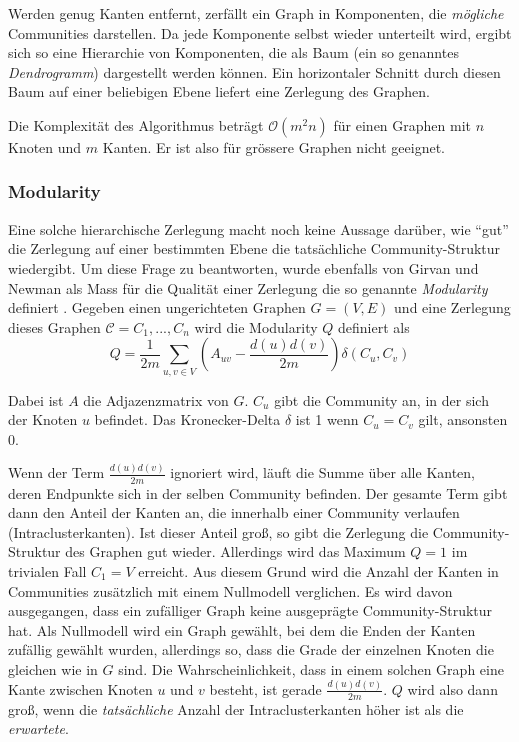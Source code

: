 Werden genug Kanten entfernt, zerfällt ein Graph in Komponenten, die
\emph{mögliche} Communities darstellen. Da jede Komponente selbst
wieder unterteilt wird, ergibt sich so eine Hierarchie von
Komponenten, die als Baum (ein so genanntes \emph{Dendrogramm})
dargestellt werden können. Ein horizontaler Schnitt durch diesen
Baum auf einer beliebigen Ebene liefert eine Zerlegung des Graphen.

Die Komplexität des Algorithmus beträgt $\mathcal{O}(m^2n)$ für
einen Graphen mit $n$ Knoten und $m$ Kanten. Er ist also für
grössere Graphen nicht geeignet.

\subsubsection{Modularity}
\label{sec:modularity}

Eine solche hierarchische Zerlegung macht noch keine Aussage
darüber, wie ``gut'' die Zerlegung auf einer bestimmten Ebene die
tatsächliche Community-Struktur wiedergibt. Um diese Frage zu
beantworten, wurde ebenfalls von Girvan und Newman als Mass für die
Qualität einer Zerlegung die so genannte \emph{Modularity}
definiert \cite{Newman2004}. Gegeben einen ungerichteten Graphen $G=(V,
E)$ und eine Zerlegung dieses Graphen $\mathcal{C} = C_1, ..., C_n$
wird die Modularity $Q$ definiert als
\begin{equation}
  \label{eq:modularity}
  Q =
  \frac{1}{2m}\sum_{u, v \in
    V}\left(A_{uv}-\frac{d(u)d(v)}{2m}\right)\delta\left(C_u, C_v\right)
\end{equation}

Dabei ist $A$ die Adjazenzmatrix von $G$. $C_u$ gibt die Community an,
in der sich der Knoten $u$ befindet. Das Kronecker-Delta $\delta$
ist 1 wenn $C_u = C_v$ gilt, ansonsten 0.

Wenn der Term $\frac{d(u)d(v)}{2m}$ ignoriert wird, läuft die Summe
über alle Kanten, deren Endpunkte sich in der selben Community
befinden. Der gesamte Term gibt dann den Anteil der Kanten an, die
innerhalb einer Community verlaufen (Intraclusterkanten). Ist dieser Anteil groß, so gibt
die Zerlegung die Community-Struktur des Graphen gut
wieder. Allerdings wird das Maximum $Q = 1$ im trivialen Fall $C_1 =
V$ erreicht. Aus diesem Grund wird die Anzahl der Kanten in
Communities zusätzlich mit einem Nullmodell verglichen. Es wird
davon ausgegangen, dass ein zufälliger Graph keine ausgeprägte
Community-Struktur hat. Als Nullmodell wird ein Graph gewählt, bei
dem die Enden der Kanten zufällig gewählt wurden, allerdings so,
dass die Grade der einzelnen Knoten die gleichen wie in $G$ sind.  Die
Wahrscheinlichkeit, dass in einem solchen Graph eine Kante zwischen
Knoten $u$ und $v$ besteht, ist gerade $\frac{d(u)d(v)}{2m}$. $Q$ wird
also dann groß, wenn die \emph{tatsächliche} Anzahl der
Intraclusterkanten höher ist als die \emph{erwartete}.

